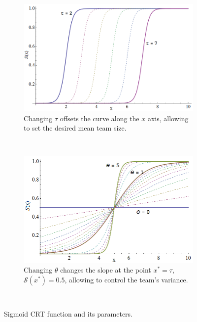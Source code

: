 \documentclass[12pt]{book}
\newcommand{\Sig}{\mathcal{S}}  %
\begin{document}
\begin{figure}[!htb]
\centering\begin{subfigure}{.5\textwidth}
\centering\includegraphics[width=\textwidth]{../assets/sigmoid2.png}
\caption{Changing $\tau$ offsets the curve along the $x$ axis, allowing to set the desired mean team size.}\label{}
\end{subfigure}~
\centering\begin{subfigure}{.5\textwidth}
\centering\includegraphics[width=\textwidth]{../assets/sigmoid1.png}
\caption{Changing $\theta$ changes the slope at the point $x^* = \tau$, $\Sig(x^*) = 0.5$, allowing to control the team's variance.}
\end{subfigure}~
\caption{Sigmoid CRT function and its parameters.}\label{fig:sig}
\end{figure}
\end{document}
